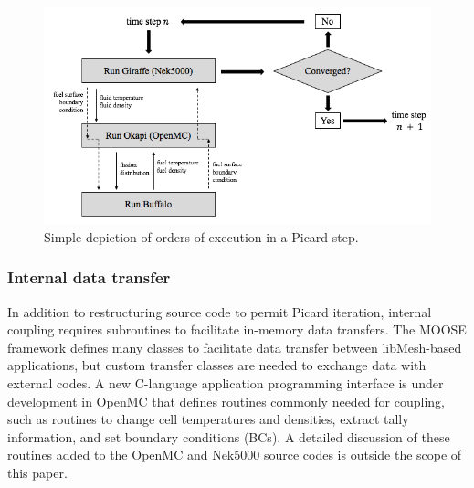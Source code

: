 \documentclass[letterpaper]{physor2018}
\begin{document}
\begin{figure}[!htb]
  \centering
  \includegraphics[scale=0.55]{../Figures/simple_Picard.pdf}
  \caption{Simple depiction of orders of execution in a Picard step.}
  \label{fig:Simple_Picard}
\end{figure}


\subsubsection{Internal data transfer}
\label{sec:DataTransfer}
In addition to restructuring source code to permit Picard iteration,
internal coupling requires subroutines to facilitate
in-memory data transfers. The MOOSE framework defines many classes
to facilitate data transfer between libMesh-based applications,
but custom transfer classes are needed to exchange data with external codes.
A new C-language application programming interface
 is under development in OpenMC that defines
routines commonly needed for coupling, such as routines to change cell temperatures and
densities, extract tally information, and set boundary conditions (BCs).
A detailed discussion of these routines added to the OpenMC and Nek5000
source codes is outside the scope of this paper.

\end{document}
